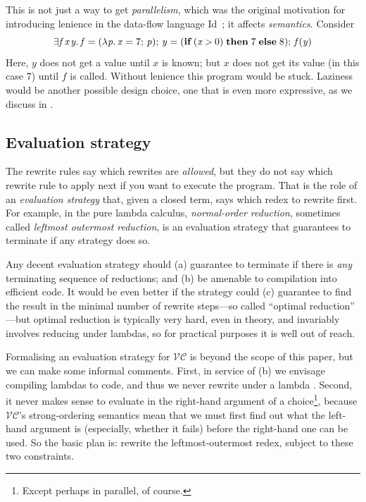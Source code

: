 \documentclass[acmsmall,review,dvipsnames]{acmart}
\newcommand{\Varid}[1]{\mathit{#1}}
\newcommand{\versecalc}{$\mathcal{VC}$}
\begin{document}
This is not just a way to get \emph{parallelism}, which was the original motivation for introducing
lenience in the data-flow language Id~\cite{lenience}; it affects
\emph{semantics}. Consider
$$
\ensuremath{\exists\Varid{f}\hspace{0.3mm}\Varid{x}\hspace{0.3mm}\Varid{y}.\,\Varid{f}\mathrel{=}(\lambda\Varid{p}.\,\Varid{x}\mathrel{=}\mathrm{7};\,\Varid{p});\,\Varid{y}\mathrel{=}(\textbf{if}\;(\Varid{x}\mathbin{>}\mathrm{0})\;\textbf{then}\;\mathrm{7}\;\textbf{else}\;\mathrm{8});\,\Varid{f}(\Varid{y})}
$$
Here, \ensuremath{\Varid{y}} does not get a value until \ensuremath{\Varid{x}} is known; but \ensuremath{\Varid{x}} does not get its
value (in this case \ensuremath{\mathrm{7}}) until \ensuremath{\Varid{f}} is called.  Without lenience this program would be stuck.
Laziness would be another possible design choice, one that is even more expressive, as we discuss in
.

\subsection{Evaluation strategy} \label{sec:eval-strategy}

The rewrite rules say which rewrites are \emph{allowed}, but they do not say which
rewrite rule to apply next if you want to execute the program. That is
the role of an \emph{evaluation strategy} that, given a closed term, says which redex
to rewrite first.  For example, in the pure lambda calculus, \emph{normal-order reduction},
sometimes called \emph{leftmost outermost reduction}, is an evaluation strategy that
guarantees to terminate if any strategy does so.

Any decent evaluation strategy should (a) guarantee to terminate if there
is \emph{any} terminating sequence of reductions; and (b) be amenable
to compilation into efficient code.
It would be even better if the strategy could (c) guarantee to find the
result in the minimal number of rewrite steps---so called ``optimal reduction'' \cite{levy1978reductions,lamping1989algorithm,asperti1998optimal}---but optimal reduction is typically very hard, even in theory, and
invariably involves reducing under lambdas, so for practical purposes it is well out of reach.

Formalising an evaluation strategy for \versecalc{} is beyond the scope of this paper, but
we can make some informal comments.  First, in service of (b) we envisage compiling
lambdas to code, and thus we never rewrite under a lambda \cite{pj-book}.
Second, it never makes sense to evaluate in the right-hand argument of
a choice\footnote{Except perhaps in parallel, of course.}, because
\versecalc{}'s strong-ordering semantics mean that we must first find out what the left-hand argument
is (especially, whether it fails) before the right-hand one can be used.
So the basic plan is: rewrite the leftmost-outermost redex, subject to these two constraints.
\end{document}

